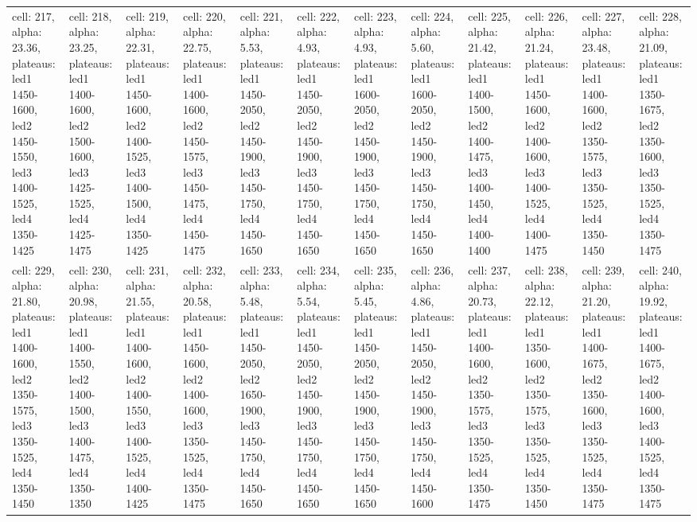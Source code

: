 \documentclass{article}
\begin{document}
\begin{landscape}
\begin{longtable}{|p{1.5cm}|p{1.5cm}|p{1.5cm}|p{1.5cm}|p{1.5cm}|p{1.5cm}|p{1.5cm}|p{1.5cm}|p{1.5cm}|p{1.5cm}|p{1.5cm}|p{1.5cm}|}
\rowcolor{lightgray} cell: 217, alpha: 23.36, plateaus: led1 1450-1600, led2 1450-1550, led3 1400-1525, led4 1350-1425 &cell: 218, alpha: 23.25, plateaus: led1 1400-1600, led2 1500-1600, led3 1425-1525, led4 1425-1475 &cell: 219, alpha: 22.31, plateaus: led1 1450-1600, led2 1400-1525, led3 1400-1500, led4 1350-1425 &cell: 220, alpha: 22.75, plateaus: led1 1400-1600, led2 1450-1575, led3 1450-1475, led4 1450-1475 &cell: 221, alpha: 5.53, plateaus: led1 1450-2050, led2 1450-1900, led3 1450-1750, led4 1450-1650 &cell: 222, alpha: 4.93, plateaus: led1 1450-2050, led2 1450-1900, led3 1450-1750, led4 1450-1650 &cell: 223, alpha: 4.93, plateaus: led1 1600-2050, led2 1450-1900, led3 1450-1750, led4 1450-1650 &cell: 224, alpha: 5.60, plateaus: led1 1600-2050, led2 1450-1900, led3 1450-1750, led4 1450-1650 &cell: 225, alpha: 21.42, plateaus: led1 1400-1500, led2 1400-1475, led3 1400-1450, led4 1400-1400 &cell: 226, alpha: 21.24, plateaus: led1 1450-1600, led2 1400-1600, led3 1400-1525, led4 1400-1475 &cell: 227, alpha: 23.48, plateaus: led1 1400-1600, led2 1350-1575, led3 1350-1525, led4 1350-1450 &cell: 228, alpha: 21.09, plateaus: led1 1350-1675, led2 1350-1600, led3 1350-1525, led4 1350-1475 \\
cell: 229, alpha: 21.80, plateaus: led1 1400-1600, led2 1350-1575, led3 1350-1525, led4 1350-1450 &cell: 230, alpha: 20.98, plateaus: led1 1400-1550, led2 1400-1500, led3 1400-1475, led4 1350-1350 &cell: 231, alpha: 21.55, plateaus: led1 1400-1600, led2 1400-1550, led3 1400-1525, led4 1400-1425 &cell: 232, alpha: 20.58, plateaus: led1 1450-1600, led2 1400-1600, led3 1350-1525, led4 1350-1475 &cell: 233, alpha: 5.48, plateaus: led1 1450-2050, led2 1650-1900, led3 1450-1750, led4 1450-1650 &cell: 234, alpha: 5.54, plateaus: led1 1450-2050, led2 1450-1900, led3 1450-1750, led4 1450-1650 &cell: 235, alpha: 5.45, plateaus: led1 1450-2050, led2 1450-1900, led3 1450-1750, led4 1450-1650 &cell: 236, alpha: 4.86, plateaus: led1 1450-2050, led2 1450-1900, led3 1450-1750, led4 1450-1600 &cell: 237, alpha: 20.73, plateaus: led1 1400-1600, led2 1350-1575, led3 1350-1525, led4 1350-1475 &cell: 238, alpha: 22.12, plateaus: led1 1350-1600, led2 1350-1575, led3 1350-1525, led4 1350-1450 &cell: 239, alpha: 21.20, plateaus: led1 1400-1675, led2 1350-1600, led3 1350-1525, led4 1350-1475 &cell: 240, alpha: 19.92, plateaus: led1 1400-1675, led2 1400-1600, led3 1400-1525, led4 1350-1475 \\

\end{longtable}
\end{landscape}
\end{document}
